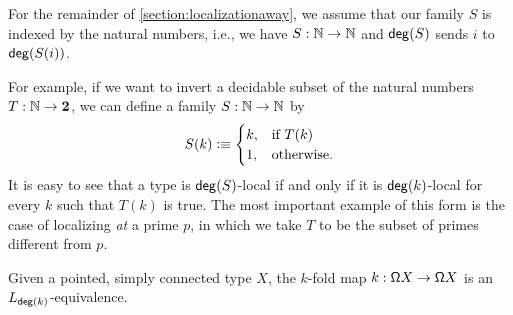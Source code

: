 For the remainder of \cref{section:localizationaway}, we assume that our family
$S$ is indexed by the natural numbers, i.e., we have $S : \mathbb{N} \to \mathbb{N}$ and
$\mathsf{deg}(S)$ sends $i$ to $\mathsf{deg}(S(i))$.

For example, if we want to invert a decidable subset of the natural numbers
$T : \mathbb{N} \to \mathbf{2}$, we can define a family $S : \mathbb{N} \to \mathbb{N}$ by
\[
    S(k) \vcentcolon\equiv \begin{cases} k, & \text{if $T(k)$} \\
                              1, & \text{otherwise.}
                \end{cases}
\]
It is easy to see that a type is $\mathsf{deg}(S)$-local if and only if it is $\mathsf{deg}(k)$-local for every $k$ such that $T(k)$ is true.
The most important example of this form is the case of localizing \emph{at} a prime $p$,
in which we take $T$ to be the subset of primes different from $p$.

\begin{lem}\label{lemma:pmapisorthogonal}
    Given a pointed, simply connected type $X$, the $k$-fold map $k : \mathsf{\Omega} X \to \mathsf{\Omega} X$
    is an $L_{\mathsf{deg}(k)}$-equivalence.
\end{lem}

